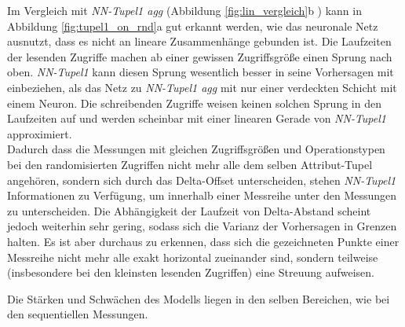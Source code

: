 \documentclass[
	12pt,
	a4paper,
	BCOR10mm,
	DIV14,
	listof=totoc,
	bibliography=totoc,
	headsepline
]{scrreprt}
\begin{document}
Im Vergleich mit \textit{NN-Tupel1 agg} (Abbildung \ref{fig:lin_vergleich}b ) kann in Abbildung \ref{fig:tupel1_on_rnd}a gut erkannt werden, wie das neuronale Netz ausnutzt, dass es nicht an lineare Zusammenhänge gebunden ist.
Die Laufzeiten der lesenden Zugriffe machen ab einer gewissen Zugriffsgröße einen Sprung nach oben. \textit{NN-Tupel1} kann diesen Sprung wesentlich besser in seine Vorhersagen mit einbeziehen, als das Netz zu \textit{NN-Tupel1 agg} mit nur einer verdeckten Schicht mit einem Neuron.
Die schreibenden Zugriffe weisen keinen solchen Sprung in den Laufzeiten auf und werden scheinbar mit einer linearen Gerade von \textit{NN-Tupel1} approximiert.\\
Dadurch dass die Messungen mit gleichen Zugriffsgrößen und Operationstypen bei den randomisierten Zugriffen nicht mehr alle dem selben Attribut-Tupel angehören, sondern sich durch das Delta-Offset unterscheiden, stehen \textit{NN-Tupel1} Informationen zu Verfügung, um innerhalb einer Messreihe unter den Messungen zu unterscheiden.
Die Abhängigkeit der Laufzeit von Delta-Abstand scheint jedoch weiterhin sehr gering, sodass sich die Varianz der Vorhersagen in Grenzen halten.
Es ist aber durchaus zu erkennen, dass sich die gezeichneten Punkte einer Messreihe nicht mehr alle exakt horizontal zueinander sind, sondern teilweise (insbesondere bei den kleinsten lesenden Zugriffen) eine Streuung aufweisen.\medskip

Die Stärken und Schwächen des Modells liegen
in den selben Bereichen, wie bei den sequentiellen Messungen.
\end{document}
